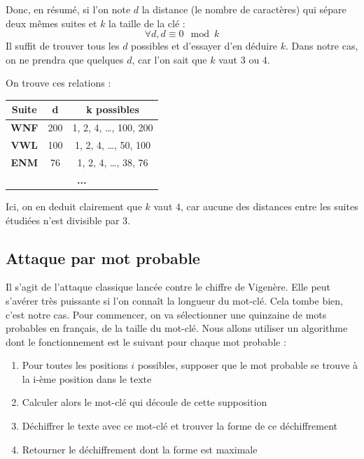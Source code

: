 \documentclass[a4paper, titlepage]{livret}
\begin{document}
Donc, en résumé, si l'on note $d$ la distance (le nombre de caractères) qui sépare deux mêmes suites et $k$ la taille de la clé :
\[\forall d, d \equiv 0 \mod{k}\] 
Il suffit de trouver tous les $d$ possibles et d'essayer d'en déduire $k$.
Dans notre cas, on ne prendra que quelques $d$, car l'on sait que $k$ vaut $3$ ou $4$.

On trouve ces relations :
\begin{center}
\begin{tabular}{|c|c|c|}
 \hline
	\textbf{Suite}& \textbf{d} & \textbf{k possibles}\\
	\hline
	\textbf{WNF} & 200 &   1, 2, 4, …, 100, 200\\
	\hline
	\textbf{VWL} & 100 &  1, 2, 4, …, 50, 100\\
	\hline
	\textbf{ENM} & 76 &  1, 2, 4, …, 38, 76\\
	\hline
	\multicolumn{3}{|c|}{\textbf{...}}\\
	\hline
\end{tabular}
  \label{tab97}
\end{center}

Ici, on en deduit clairement que $k$ vaut $4$, car aucune des distances entre les suites étudiées n'est divisible par $3$.

\subsection{Attaque par mot probable}

Il s'agit de l'attaque \og classique \fg{} lancée contre le chiffre de Vigenère. Elle peut s'avérer très puissante si l'on connaît la longueur du mot-clé. 
Cela tombe bien, c'est notre cas.
Pour commencer, on va sélectionner une quinzaine de mots probables en français, de la taille du mot-clé.
Nous allons utiliser un algorithme dont le fonctionnement est le suivant pour chaque mot probable :
\begin{enumerate}
\item Pour toutes les positions $i$ possibles, supposer que le mot probable se trouve à la i-ème position dans le texte
\item Calculer alors le mot-clé qui découle de cette supposition
\item Déchiffrer le texte avec ce mot-clé et trouver la forme de ce déchiffrement
\item Retourner le déchiffrement dont la forme est maximale
\end{enumerate}
\end{document}
